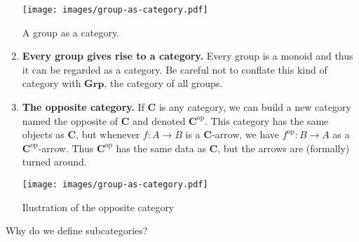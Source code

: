 \begin{example}
\begin{enumerate}[label=\arabic*.]
    \begin{marginfigure}[3\baselineskip]
        \captionsetup{type=figure}
        \centering
        \texttt{[image: images/group-as-category.pdf]}\vspace{\baselineskip}
        \caption{A group as a category.}
    \end{marginfigure}
    \item \textbf{Every group gives rise to a  category.}
    Every group is a monoid and thus it can be regarded as a category.
    Be careful not to conflate this  kind of category   with \(\mathbf{Grp}\), the category of all groups.

    \item \textbf{The opposite category.} If \(\mathbf{C}\) is any category, we can build a new category named the opposite of \(\mathbf{C}\) and denoted \(\mathbf{C}^{\text{op}}\). This category has the same objects as \(\mathbf{C}\), but whenever \(f\colon A\to B\) is a \(\mathbf{C}\)-arrow, we have  \(f^{\text{op}}\colon B\to A\) as a \(\mathbf{C}^{\text{op}}\)-arrow. 
    Thus \(\mathbf{C}^{\text{op}}\) has the same data as \(\mathbf{C}\), but the arrows are (formally) turned around.
    \begin{marginfigure}[0\baselineskip]
        \captionsetup{type=figure}
        \centering
        \texttt{[image: images/group-as-category.pdf]}
        \caption{Ilustration of the opposite category}
    \end{marginfigure}
\end{enumerate}
\end{example}

Why do we define subcategories?

